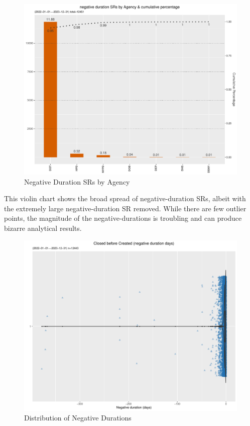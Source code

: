 \documentclass[12pt, titlepage]{article}
\begin{document}
\begin{figure}[tbp]
 	 \centering
 	 \includegraphics[width = \textwidth]{negative_duration_SR_barchart.pdf}
	  \caption{Negative Duration SRs by Agency}
	  \label{fig:negative-duration}
\end{figure}

This violin chart shows the broad spread of negative-duration SRs, albeit with 
the extremely large negative-duration SR removed. While there are few 
outlier points, the magnitude of the negative-durations is troubling and can 
produce bizarre analytical results.

\begin{figure}[tbp]
 	 \centering
 	 \includegraphics[width = \textwidth]{negative_duration_SR_violin.pdf}
	 \caption{Distribution of Negative Durations}
	 \label{fig:negative-duration-violin}
\end{figure}
\end{document}
